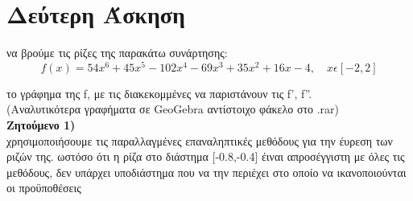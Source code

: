\documentclass{article}
\newcommand{\lt}{\latintext}
\newcommand{\gt}{\greektext}
\begin{document}
\newpage
\section{\gt Δεύτερη Άσκηση}
 να βρούμε τις ρίζες της παρακάτω συνάρτησης:
\begin{equation*}
    f(x) = 54x^{6} + 45x^{5} - 102x^{4} - 69x^{3} + 35x^{2} + 16x - 4, \quad x\epsilon[-2,2]
\end{equation*}
\begin{center}
\end{center}
\gt το γράφημα της \lt f\gt , με τις διακεκομμένες να παριστάνουν τις \lt f', f''.\\
\gt (Αναλυτικότερα γραφήματα σε \lt GeoGebra  αντίστοιχο φάκελο στο \lt.rar)\\
\newpage
\textbf{\gt Ζητούμενο 1)}\\
 χρησιμοποιήσουμε τις παραλλαγμένες επαναληπτικές μεθόδους για την έυρεση των ριζών της.
 ωστόσο ότι η ρίζα στο διάστημα [-0.8,-0.4] έιναι απροσέγγιστη με όλες τις μεθόδους,
 δεν υπάρχει υποδιάστημα που να την περιέχει στο οποίο να ικανοποιούνται οι προϋποθέσεις
\end{document}
